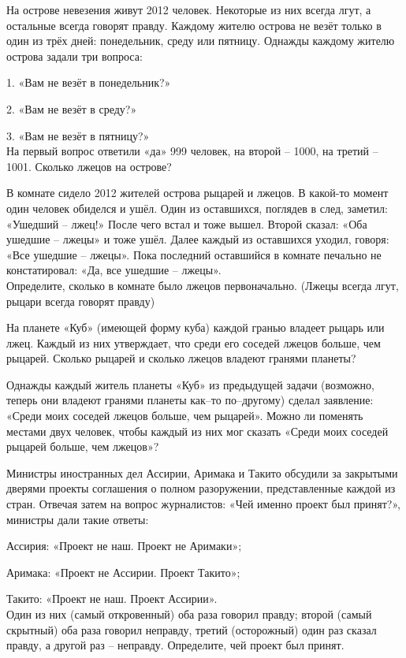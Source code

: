 \begin{thm}
    На острове невезения живут 2012 человек. Некоторые из них всегда лгут, а остальные всегда говорят правду. Каждому жителю острова не везёт только в один из трёх дней: понедельник, среду или пятницу. Однажды каждому жителю острова задали три вопроса:
    \par
    1. «Вам не везёт в понедельник?»
    \par 
    2. «Вам не везёт в среду?»
    \par
    3. «Вам не везёт в пятницу?»
    \\
    На первый вопрос ответили «да» 999 человек, на второй – 1000, на третий – 1001. Сколько лжецов на острове?
\end{thm}

\begin{thm}
    В комнате сидело 2012 жителей острова рыцарей и лжецов. В какой-то момент один человек обиделся и ушёл. Один из оставшихся, поглядев в след, заметил: «Ушедший – лжец!» После чего встал и тоже вышел. Второй сказал: «Оба ушедшие – лжецы» и тоже ушёл. Далее каждый из оставшихся уходил, говоря: «Все ушедшие – лжецы». Пока последний оставшийся в комнате печально не констатировал: «Да, все ушедшие – лжецы».
    \\
    Определите, сколько в комнате было лжецов первоначально. (Лжецы всегда лгут, рыцари всегда говорят правду)
\end{thm}

\begin{thm}
    На планете «Куб» (имеющей форму куба) каждой гранью владеет рыцарь или лжец. Каждый из них утверждает, что среди его соседей лжецов больше, чем рыцарей. Сколько рыцарей и сколько лжецов владеют гранями планеты?
\end{thm}

\begin{thm}
    Однажды каждый житель планеты «Куб» из предыдущей задачи (возможно, теперь они владеют гранями планеты как--то по--другому) сделал заявление: «Среди моих соседей лжецов больше, чем рыцарей». Можно ли поменять местами двух человек, чтобы каждый из них мог сказать «Среди моих соседей рыцарей больше, чем лжецов»?
\end{thm}

\newpage

\begin{thm}
    Министры иностранных дел Ассирии, Аримака и Такито обсудили за закрытыми дверями проекты соглашения о полном разоружении, представленные каждой из стран. Отвечая затем на вопрос журналистов: «Чей именно проект был принят?», министры дали такие ответы:
    \par
    Ассирия: «Проект не наш. Проект не Аримаки»;
    \par
    Аримака: «Проект не Ассирии. Проект Такито»;
    \par
    Такито: «Проект не наш. Проект Ассирии».
    \\
    Один из них (самый откровенный) оба раза говорил правду; второй (самый скрытный) оба раза говорил неправду, третий (осторожный) один раз сказал правду, а другой раз – неправду. Определите, чей проект был принят.
\end{thm}

